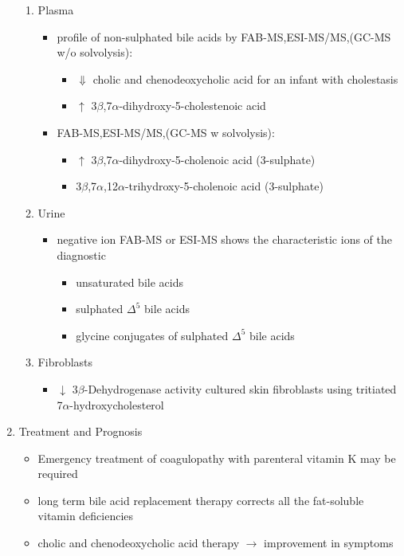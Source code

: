\documentclass{scrartcl}
\begin{document}
\begin{enumerate}
\begin{enumerate}
\item Plasma
\label{sec:orgc9fcf96}
\begin{itemize}
\item profile of non-sulphated bile acids by FAB-MS,ESI-MS/MS,(GC-MS w/o solvolysis): 
\begin{itemize}
\item \(\Downarrow\) cholic and chenodeoxycholic acid for an infant with cholestasis
\item \(\uparrow\) 3\(\beta\),7\(\alpha\)-dihydroxy-5-cholestenoic acid
\end{itemize}
\item FAB-MS,ESI-MS/MS,(GC-MS w solvolysis):
\begin{itemize}
\item \(\uparrow\) 3\(\beta\),7\(\alpha\)-dihydroxy-5-cholenoic acid (3-sulphate)
\item 3\(\beta\),7\(\alpha\),12\(\alpha\)-trihydroxy-5-cholenoic acid (3-sulphate)
\end{itemize}
\end{itemize}

\item Urine
\label{sec:org83d5563}
\begin{itemize}
\item negative ion FAB-MS or ESI-MS shows the characteristic ions of the
diagnostic
\begin{itemize}
\item unsaturated bile acids
\item sulphated \(\Delta^{\text{5}}\) bile acids
\item glycine conjugates of sulphated \(\Delta^{\text{5}}\) bile acids
\end{itemize}
\end{itemize}

\item Fibroblasts
\label{sec:org24bb640}
\begin{itemize}
\item \(\downarrow\) 3\(\beta\)-Dehydrogenase activity cultured skin fibroblasts using
tritiated 7\(\alpha\)-hydroxycholesterol
\end{itemize}
\end{enumerate}


\item Treatment and Prognosis
\label{sec:org5d4d4d0}
\begin{itemize}
\item Emergency treatment of coagulopathy with parenteral vitamin K may be required
\item long term bile acid replacement therapy corrects all the fat-soluble
vitamin deficiencies

\item cholic and chenodeoxycholic acid therapy \(\to\) improvement in symptoms
\end{itemize}
\end{enumerate}
\end{document}
